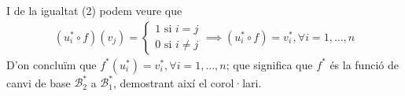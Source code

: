 \documentclass[a4paper, 11pt]{article}
\begin{document}
    I de la igualtat (2) podem veure que
    \begin{gather*}
        (u^*_i \circ f)(v_j) = 
        \begin{cases}
            1 \text{ si } i = j\\
            0 \text{ si } i \neq j
        \end{cases}
        \implies (u^*_i \circ f) = v^*_i, \forall i = 1,\dots,n
    \end{gather*}
    D'on conclu\"im que $ f^*(u^*_i)=v^*_i, \forall i = 1,\dots,n $; que significa que $ f^* $ \'es la funci\'o de canvi de base $\mathcal{B}_2^*$ a $ \mathcal{B}_1^* $, demostrant aix\'i el corol·lari.\\\\
\end{document}
